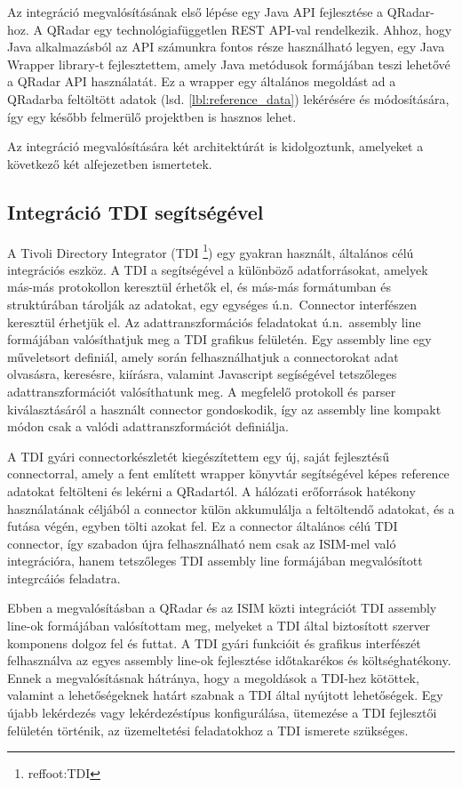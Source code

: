 Az integráció megvalósításának első lépése egy Java API fejlesztése a QRadar-hoz. A QRadar egy technológiafüggetlen REST API-val rendelkezik. Ahhoz, hogy Java alkalmazásból az API számunkra fontos része használható legyen, egy Java Wrapper library-t fejlesztettem, amely Java metódusok formájában teszi lehetővé a QRadar API használatát. Ez a wrapper egy általános megoldást ad a QRadarba feltöltött adatok (lsd. \ref{lbl:reference_data}) lekérésére és módosítására, így egy később felmerülő projektben is hasznos lehet.

Az integráció megvalósítására két architektúrát is kidolgoztunk, amelyeket a következő két alfejezetben ismertetek.

\subsection{Integráció TDI segítségével}

A Tivoli Directory Integrator (TDI \footnote[3]{ref{foot:TDI}}) egy gyakran használt, általános célú integrációs eszköz. 
A TDI a segítségével a különböző adatforrásokat, amelyek más-más protokollon keresztül érhetők el, és más-más formátumban és struktúrában tárolják az adatokat, egy egységes ú.n.~Connector interfészen keresztül érhetjük el. Az adattranszformációs feladatokat ú.n.~assembly line formájában valósíthatjuk meg a TDI grafikus felületén. Egy assembly line egy műveletsort definiál, amely során felhasználhatjuk a connectorokat adat olvasásra, keresésre, kiírásra, valamint Javascript segíségével tetszőleges adattranszformációt valósíthatunk meg. A megfelelő protokoll és parser kiválasztásáról a használt connector gondoskodik, így az assembly line kompakt módon csak a valódi adattranszformációt definiálja. 

A TDI gyári connectorkészletét kiegészítettem egy új, saját fejlesztésű connectorral, amely a fent említett wrapper könyvtár segítségével képes reference adatokat feltölteni és lekérni a QRadartól. A hálózati erőforrások hatékony használatának céljából a connector külön akkumulálja a feltöltendő adatokat, és a futása végén, egyben tölti azokat fel. Ez a connector általános célú TDI connector, így szabadon újra felhasználható nem csak az ISIM-mel való integrációra, hanem tetszőleges TDI assembly line formájában megvalósított integrcáiós feladatra. 

Ebben a megvalósításban a QRadar és az ISIM közti integrációt TDI assembly line-ok formájában valósítottam meg, melyeket a TDI által biztosított szerver komponens dolgoz fel és futtat. A TDI gyári funkcióit és grafikus interfészét felhasználva az egyes assembly line-ok fejlesztése időtakarékos és költséghatékony. Ennek a megvalósításnak hátránya, hogy a megoldások a TDI-hez kötöttek, valamint a lehetőségeknek határt szabnak a TDI által nyújtott lehetőségek. Egy újabb lekérdezés vagy lekérdezéstípus konfigurálása, ütemezése a TDI fejlesztői felületén történik, az üzemeltetési feladatokhoz a TDI ismerete szükséges.


